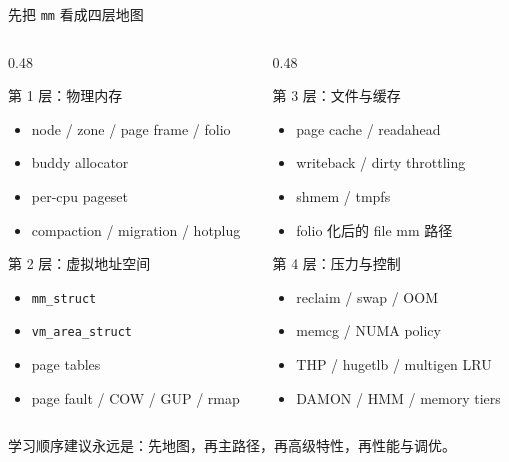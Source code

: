 \documentclass[UTF8,aspectratio=169]{ctexbeamer}
\begin{document}
\begin{frame}[t]{先把 \texttt{mm} 看成四层地图}
\small
\begin{columns}[T]
  \begin{column}{0.48\textwidth}
    \begin{block}{第 1 层：物理内存}
    \begin{itemize}
      \item node / zone / page frame / folio
      \item buddy allocator
      \item per-cpu pageset
      \item compaction / migration / hotplug
    \end{itemize}
    \end{block}

    \begin{block}{第 2 层：虚拟地址空间}
    \begin{itemize}
      \item \texttt{mm\_struct}
      \item \texttt{vm\_area\_struct}
      \item page tables
      \item page fault / COW / GUP / rmap
    \end{itemize}
    \end{block}
  \end{column}
  \begin{column}{0.48\textwidth}
    \begin{block}{第 3 层：文件与缓存}
    \begin{itemize}
      \item page cache / readahead
      \item writeback / dirty throttling
      \item shmem / tmpfs
      \item folio 化后的 file mm 路径
    \end{itemize}
    \end{block}

    \begin{block}{第 4 层：压力与控制}
    \begin{itemize}
      \item reclaim / swap / OOM
      \item memcg / NUMA policy
      \item THP / hugetlb / multigen LRU
      \item DAMON / HMM / memory tiers
    \end{itemize}
    \end{block}
  \end{column}
\end{columns}

\vspace{0.4em}
\small
学习顺序建议永远是：先地图，再主路径，再高级特性，再性能与调优。
\end{frame}
\end{document}
